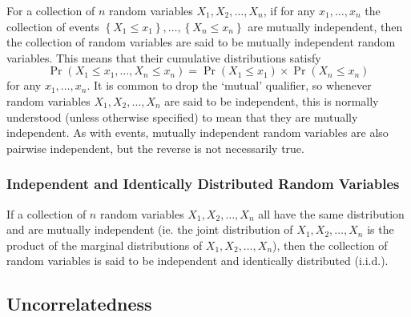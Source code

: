 \documentclass[11pt]{report} %
\begin{document}
For a collection of $n$ random variables $X_{1}, X_{2}, \dots, X_{n}$, if for any $x_{1}, \dots, x_{n}$ the collection of events $\left\{X_{1} \leq x_{1}\right\}, \dots, \left\{X_{n} \leq x_{n}\right\}$ are mutually independent, then the collection of random variables are said to be mutually independent random variables. This means that their cumulative distributions satisfy
\begin{equation}
\operatorname{Pr}\left(X_{1} \leq x_{1}, \dots, X_{n} \leq x_{n}\right) = \operatorname{Pr}\left(X_{1} \leq x_{1}\right)\times\operatorname{Pr}\left(X_{n} \leq x_{n}\right)
\end{equation}
for any $x_{1}, \dots, x_{n}$. It is common to drop the `mutual' qualifier, so whenever random variables $X_{1}, X_{2}, \dots, X_{n}$ are said to be independent, this is normally understood (unless otherwise specified) to mean that they are mutually independent. As with events, mutually independent random variables are also pairwise independent, but the reverse is not necessarily true.

\subsubsection{Independent and Identically Distributed Random Variables}

If a collection of $n$ random variables $X_{1}, X_{2}, \dots, X_{n}$ all have the same distribution and are mutually independent (ie. the joint distribution of $X_{1}, X_{2}, \dots, X_{n}$ is the product of the marginal distributions of $X_{1}, X_{2}, \dots, X_{n}$), then the collection of random variables is said to be independent and identically distributed (i.i.d.).

\subsection{Uncorrelatedness}
\end{document}
